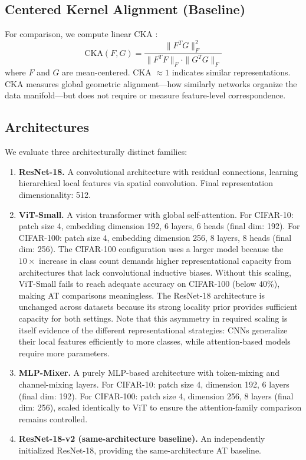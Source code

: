 \documentclass{article}
\begin{document}
\subsection{Centered Kernel Alignment (Baseline)}

For comparison, we compute linear CKA \citep{kornblith2019similarity}:
\begin{equation}
    \text{CKA}(F, G) = \frac{\|F^T G\|_F^2}{\|F^T F\|_F \cdot \|G^T G\|_F}
\end{equation}
where $F$ and $G$ are mean-centered. CKA $\approx 1$ indicates similar representations. CKA measures global geometric alignment---how similarly networks organize the data manifold---but does not require or measure feature-level correspondence.

\subsection{Architectures}

We evaluate three architecturally distinct families:

\begin{enumerate}
    \item \textbf{ResNet-18.} A convolutional architecture with residual connections, learning hierarchical local features via spatial convolution. Final representation dimensionality: 512.
    \item \textbf{ViT-Small.} A vision transformer with global self-attention. For CIFAR-10: patch size 4, embedding dimension 192, 6 layers, 6 heads (final dim: 192). For CIFAR-100: patch size 4, embedding dimension 256, 8 layers, 8 heads (final dim: 256). The CIFAR-100 configuration uses a larger model because the $10\times$ increase in class count demands higher representational capacity from architectures that lack convolutional inductive biases. Without this scaling, ViT-Small fails to reach adequate accuracy on CIFAR-100 (below $40\%$), making AT comparisons meaningless. The ResNet-18 architecture is unchanged across datasets because its strong locality prior provides sufficient capacity for both settings. Note that this asymmetry in required scaling is itself evidence of the different representational strategies: CNNs generalize their local features efficiently to more classes, while attention-based models require more parameters.
    \item \textbf{MLP-Mixer.} A purely MLP-based architecture with token-mixing and channel-mixing layers. For CIFAR-10: patch size 4, dimension 192, 6 layers (final dim: 192). For CIFAR-100: patch size 4, dimension 256, 8 layers (final dim: 256), scaled identically to ViT to ensure the attention-family comparison remains controlled.
    \item \textbf{ResNet-18-v2 (same-architecture baseline).} An independently initialized ResNet-18, providing the same-architecture AT baseline.
\end{enumerate}
\end{document}
